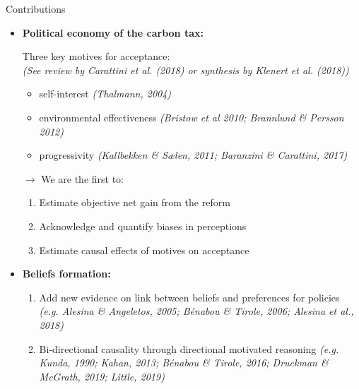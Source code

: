 \documentclass[aspectratio=169,9pt,dvipsnames]{beamer}
\begin{document}
    \begin{frame}{Contributions}

\begin{itemize}
    \item \textbf{Political economy of the carbon tax:}

    \vspace{0.2cm}

    Three key motives for acceptance: \\ \textcolor{teal_dark}{\textit{{\small (See review by Carattini et al. (2018) or synthesis by Klenert et al. (2018))}}} 
    \begin{itemize}
    \item self-interest \textcolor{teal_dark}{{\small \textit{(Thalmann, 2004)}}}
    \item environmental effectiveness \textcolor{teal_dark}{{\small \textit{(Bristow et al 2010; Brannlund \& Persson 2012)}}}
    \item progressivity \textcolor{teal_dark}{{\small \textit{(Kallbekken \& Sælen, 2011; Baranzini \& Carattini, 2017)}}} %
    \end{itemize}
    \vspace{0.3cm}
    
    
    \pause
    $\rightarrow$ We are the first to: \vspace{0.15cm}
    \begin{enumerate}[<+->]
        \item Estimate objective net gain from the reform\vspace{0.15cm}
        \item Acknowledge and quantify biases in perceptions \vspace{0.15cm}
        \item Estimate causal effects of motives on acceptance
    \end{enumerate}

	\vspace{0.6cm}    
    \pause 
    \item \textbf{Beliefs formation:} \vspace{0.2cm}
    \begin{enumerate}[<+->]
        \item Add new evidence on link between beliefs and preferences for policies \textcolor{teal_dark}{{\small \textit{(e.g. Alesina \& Angeletos, 2005; Bénabou \& Tirole, 2006; Alesina et al., 2018)}}} \vspace{0.15cm}     
        \item Bi-directional causality through directional motivated reasoning \textcolor{teal_dark}{{\small \textit{(e.g. Kunda, 1990; Kahan, 2013; Bénabou \& Tirole, 2016; Druckman \& McGrath, 2019; Little, 2019)}}}
\end{enumerate}
\end{itemize}



\end{frame}
\end{document}
